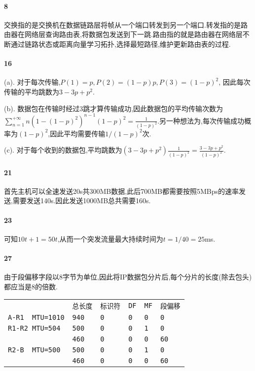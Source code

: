 \documentclass[a4paper]{article}
\begin{document}
\paragraph{8}
交换指的是交换机在数据链路层将帧从一个端口转发到另一个端口.转发指的是路由器在网络层查询路由表,将数据包发送到下一跳.路由指的就是路由器在网络层不断通过链路状态或距离向量学习拓扑,选择最短路径,维护更新路由表的过程.
\paragraph{16}
(a). 对于每次传输,$P(1)=p,P(2)=(1-p)p,P(3)=(1-p)^2$, 因此每次传输的平均跳数为$3-3p+p^2$.

(b). 数据包在传输时经过3跳才算传输成功,因此数据包的平均传输次数为$\sum_{n=1}^{+\infty}n(1-(1-p)^2)^{n-1}(1-p)^2=\frac{1}{(1-p)^2}$.另一种想法为,每次传输成功概率为$(1-p)^2$,因此平均需要传输$1/(1-p)^2$次.

(c). 对于每个收到的数据包,平均跳数为$(3-3p+p^2)\frac{1}{(1-p)^2}=\frac{3-3p+p^2}{(1-p)^2}$.
\paragraph{21}
首先主机可以全速发送20s共300MB数据,此后700MB都需要按照5MBps的速率发送,需要发送140s.因此发送1000MB总共需要160s.
\paragraph{23}
可知$10t+1=50t$,从而一个突发流量最大持续时间为$t=1/40=25$ms.
\paragraph{27}
由于段偏移字段以8字节为单位,因此将IP数据包分片后,每个分片的长度(除去包头)都应当是8的倍数.
\begin{table}[H]
    \begin{tabular}{|llllll|}
        \hline
                              & \verb|总长度| & \verb|标识符| & \verb|DF| & \verb|MF| & \verb|段偏移| \\
        \verb|A-R1  MTU=1010| & \verb|940| & \verb|0|   & \verb|0|  & \verb|0|  & \verb|0|   \\
        \verb|R1-R2 MTU=504|  & \verb|500| & \verb|0|   & \verb|0|  & \verb|1|  & \verb|0|   \\
                              & \verb|460| & \verb|0|   & \verb|0|  & \verb|0|  & \verb|60|  \\
        \verb|R2-B  MTU=500|  & \verb|500| & \verb|0|   & \verb|0|  & \verb|1|  & \verb|0|   \\
                              & \verb|460| & \verb|0|   & \verb|0|  & \verb|0|  & \verb|60|  \\ \hline
    \end{tabular}
\end{table}
\end{document}
